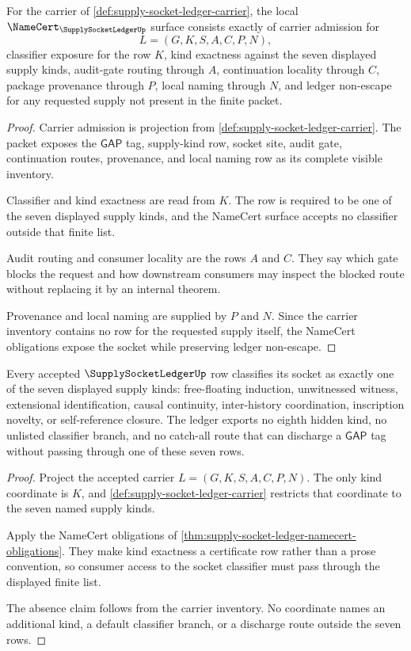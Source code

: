 \begin{theorem}
\label{thm:supply-socket-ledger-namecert-obligations}
For the carrier of \autoref{def:supply-socket-ledger-carrier}, the local $\NameCert_{\SupplySocketLedgerUp}$ surface consists exactly of carrier admission for
$$
L=(G,K,S,A,C,P,N),
$$
classifier exposure for the row $K$, kind exactness against the seven displayed supply kinds, audit-gate routing through $A$, continuation locality through $C$, package provenance through $P$, local naming through $N$, and ledger non-escape for any requested supply not present in the finite packet.
\end{theorem}
\begin{proof}
Carrier admission is projection from \autoref{def:supply-socket-ledger-carrier}. The packet exposes the $\mathsf{GAP}$ tag, supply-kind row, socket site, audit gate, continuation routes, provenance, and local naming row as its complete visible inventory.

Classifier and kind exactness are read from $K$. The row is required to be one of the seven displayed supply kinds, and the NameCert surface accepts no classifier outside that finite list.

Audit routing and consumer locality are the rows $A$ and $C$. They say which gate blocks the request and how downstream consumers may inspect the blocked route without replacing it by an internal theorem.

Provenance and local naming are supplied by $P$ and $N$. Since the carrier inventory contains no row for the requested supply itself, the NameCert obligations expose the socket while preserving ledger non-escape.
\end{proof}

\begin{theorem}
\label{thm:supply-socket-ledger-kind-exhaustion}
Every accepted $\SupplySocketLedgerUp$ row classifies its socket as exactly one of the seven displayed supply kinds: free-floating induction, unwitnessed witness, extensional identification, causal continuity, inter-history coordination, inscription novelty, or self-reference closure. The ledger exports no eighth hidden kind, no unlisted classifier branch, and no catch-all route that can discharge a $\mathsf{GAP}$ tag without passing through one of these seven rows.
\end{theorem}
\begin{proof}
Project the accepted carrier $L=(G,K,S,A,C,P,N)$. The only kind coordinate is $K$, and \autoref{def:supply-socket-ledger-carrier} restricts that coordinate to the seven named supply kinds.

Apply the NameCert obligations of \autoref{thm:supply-socket-ledger-namecert-obligations}. They make kind exactness a certificate row rather than a prose convention, so consumer access to the socket classifier must pass through the displayed finite list.

The absence claim follows from the carrier inventory. No coordinate names an additional kind, a default classifier branch, or a discharge route outside the seven rows.
\end{proof}

